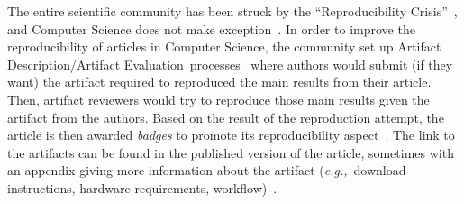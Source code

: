 \documentclass[sigconf,natbib=false]{acmart}
\newcommand{\eg}{\emph{e.g.,}}
\newcommand{\ad}{Artifact Description}
\newcommand{\aeval}{Artifact Evaluation}
\newcommand{\adae}{\ad/\aeval}
\newcommand{\todo}[1]{{\color{red}{TODO: #1}}}
\begin{document}
% 

The entire scientific community has been struck by the ``Reproducibility Crisis''~\cite{baker500ScientistsLift2016}, and Computer Science does not make exception~\cite{collberg_repeatability_2015}.
In order to improve the reproducibility of articles in Computer Science, the community set up \adae\ processes~\cite{kidwell2016badges} where authors would submit (if they want) the artifact required to reproduced the main results from their article.
Then, artifact reviewers would try to reproduce those main results given the artifact from the authors.
Based on the result of the reproduction attempt, the article is then awarded \emph{badges} to promote its reproducibility aspect~\cite{acm-badges}.
The link to the artifacts can be found in the published version of the article, sometimes with an appendix giving more information about the artifact (\eg\ download instructions, hardware requirements, workflow)~\cite{paperswithcode, kang2023papers, hong2013software}.
\end{document}
